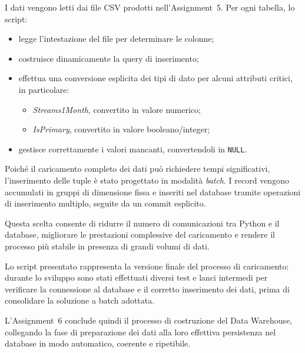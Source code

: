 I dati vengono letti dai file CSV prodotti nell’Assignment~5. Per ogni tabella,
lo script:
\begin{itemize}
    \item legge l’intestazione del file per determinare le colonne;
    \item costruisce dinamicamente la query di inserimento;
    \item effettua una conversione esplicita dei tipi di dato per alcuni
    attributi critici, in particolare:
    \begin{itemize}
        \item \textit{Streams1Month}, convertito in valore numerico;
        \item \textit{IsPrimary}, convertito in valore booleano/integer;
    \end{itemize}
    \item gestisce correttamente i valori mancanti, convertendoli in
    \texttt{NULL}.
\end{itemize}

Poiché il caricamento completo dei dati può richiedere tempi significativi,
l’inserimento delle tuple è stato progettato in modalità \textit{batch}. I
record vengono accumulati in gruppi di dimensione fissa e inseriti nel database
tramite operazioni di inserimento multiplo, seguite da un commit esplicito.

Questa scelta consente di ridurre il numero di comunicazioni tra Python e il
database, migliorare le prestazioni complessive del caricamento e rendere il
processo più stabile in presenza di grandi volumi di dati.

Lo script presentato rappresenta la versione finale del processo di
caricamento: durante lo sviluppo sono stati effettuati diversi test e lanci
intermedi per verificare la connessione al database e il corretto inserimento
dei dati, prima di consolidare la soluzione a batch adottata.

L’Assignment~6 conclude quindi il processo di costruzione del Data Warehouse,
collegando la fase di preparazione dei dati alla loro effettiva persistenza nel
database in modo automatico, coerente e ripetibile.

